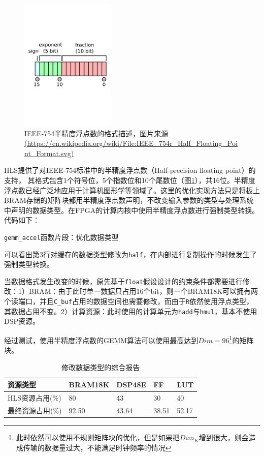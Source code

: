 \begin{figure}[!ht]
\centering
\includegraphics[width=0.4\textwidth]{assets/imgs/half}
\caption{IEEE-754半精度浮点数的格式描述，图片来源\url{(https://en.wikipedia.org/wiki/File:IEEE_754r_Half_Floating_Point_Format.svg)}}
\label{fig:half}
\end{figure}

HLS提供了对IEEE-754标准\supercite{ieee2008754}中的半精度浮点数（Half-precision floating point）的支持，
其格式包含1个符号位，5个指数位和10个尾数位（图\ref{fig:half}），共16位。半精度浮点数已经广泛地应用于计算机图形学等领域了。这里的优化实现方法只是将板上BRAM存储的矩阵块都用半精度浮点数声明，不改变输入参数的类型与处理系统中声明的数据类型。在FPGA的计算内核中使用半精度浮点数进行强制类型转换。代码如下：

\begin{listing}[!ht]
	
	\caption{\texttt{gemm\_accel}函数片段：优化数据类型}
	\label{lst:gemmaccelhalf}
\end{listing}

可以看出第3行对缓存的数据类型修改为\texttt{half}，在内部进行复制操作的时候发生了强制类型转换。

当数据格式发生改变的时候，原先基于\texttt{float}假设设计的约束条件都需要进行修改：1）BRAM：由于此时单一数据只占用16个bit，则一个BRAM18K可以拥有两个读端口，并且\texttt{C\_buf}占用的数据空间也需要修改，而由于\texttt{R}依然使用浮点类型，其数据占用不变。2）计算资源：此时使用的计算单元为\texttt{hadd}与\texttt{hmul}，基本不使用DSP资源。

经过测试，使用半精度浮点数的GEMM算法可以使用最高达到$Dim=96$\footnote{此时依然可以使用不规则矩阵块的优化，但是如果把\(\mathit{Dim_K}\)增到很大，则会造成传输的数据量过大，不能满足时钟频率的情况}的矩阵块。
	
\begin{table}[!ht]
	\centering
	\begin{tabular}{|l|l|l|l|l|}
		\hline
		资源类型 & BRAM18K  & DSP48E & FF & LUT \\ \hline
		HLS资源占用(\%) & 80 & 43 & 30 & 40 \\ \hline
		最终资源占用(\%) & 92.50 & 43.64 & 38.51 & 52.17 	\\ \hline
	\end{tabular}
	
	\caption{修改数据类型的综合报告}
	\label{table:gemmhalf}
\end{table}
	
